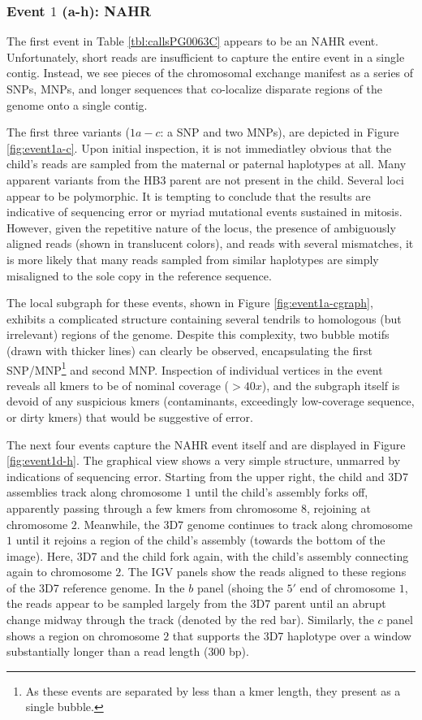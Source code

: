 \subsubsection{Event $1$ (a-h): NAHR}

The first event in Table \ref{tbl:callsPG0063C} appears to be an NAHR event.  Unfortunately, short reads are insufficient to capture the entire event in a single contig.  Instead, we see pieces of the chromosomal exchange manifest as a series of SNPs, MNPs, and longer sequences that co-localize disparate regions of the genome onto a single contig.

The first three variants ($1a-c$: a SNP and two MNPs), are depicted in Figure \ref{fig:event1a-c}.  Upon initial inspection, it is not immediatley obvious that the child's reads are sampled from the maternal or paternal haplotypes at all.  Many apparent variants from the HB3 parent are not present in the child.  Several loci appear to be polymorphic.  It is tempting to conclude that the results are indicative of sequencing error or myriad mutational events sustained in mitosis.  However, given the repetitive nature of the locus, the presence of ambiguously aligned reads (shown in translucent colors), and reads with several mismatches, it is more likely that many reads sampled from similar haplotypes are simply misaligned to the sole copy in the reference sequence.

The local subgraph for these events, shown in Figure \ref{fig:event1a-cgraph}, exhibits a complicated structure containing several tendrils to homologous (but irrelevant) regions of the genome.  Despite this complexity, two bubble motifs (drawn with thicker lines) can clearly be observed, encapsulating the first SNP/MNP\footnote{As these events are separated by less than a kmer length, they present as a single bubble.} and second MNP.  Inspection of individual vertices in the event reveals all kmers to be of nominal coverage ($> 40x$), and the subgraph itself is devoid of any suspicious kmers (contaminants, exceedingly low-coverage sequence, or dirty kmers) that would be suggestive of error.

The next four events capture the NAHR event itself and are displayed in Figure \ref{fig:event1d-h}.  The graphical view shows a very simple structure, unmarred by indications of sequencing error.  Starting from the upper right, the child and 3D7 assemblies track along chromosome $1$ until the child's assembly forks off, apparently passing through a few kmers from chromosome $8$, rejoining at chromosome $2$.  Meanwhile, the 3D7 genome continues to track along chromosome $1$ until it rejoins a region of the child's assembly (towards the bottom of the image).  Here, 3D7 and the child fork again, with the child's assembly connecting again to chromosome $2$.  The IGV panels show the reads aligned to these regions of the 3D7 reference genome.  In the $b$ panel (shoing the $5'$ end of chromosome $1$, the reads appear to be sampled largely from the 3D7 parent until an abrupt change midway through the track (denoted by the red bar).  Similarly, the $c$ panel shows a region on chromosome $2$ that supports the 3D7 haplotype over a window substantially longer than a read length ($300$ bp).

